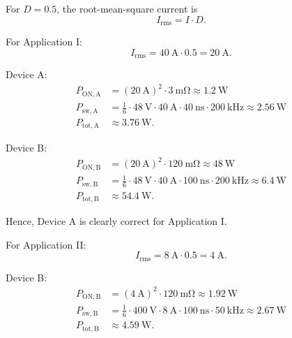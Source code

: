 \begin{solutionblock}
    For $D = 0.5$, the root-mean-square current is
    \begin{equation}
        I_\mathrm{rms} = I \cdot D.
    \end{equation}

    For Application I:
    \begin{equation}
        I_\mathrm{rms} = \SI{40}{\ampere} \cdot 0.5 = \SI{20}{\ampere}.
    \end{equation}

    Device A:
    \begin{align}
        P_\mathrm{ON,A} &= \left( \SI{20}{\ampere} \right)^2 \cdot \SI{3}{\milli\ohm} \approx \SI{1.2}{\watt} \\
        P_\mathrm{sw,A} &= \frac{1}{6} \cdot \SI{48}{\volt} \cdot \SI{40}{\ampere} \cdot \SI{40}{\nano\second} \cdot \SI{200}{\kilo\hertz}
        \approx \SI{2.56}{\watt} \\
        P_\mathrm{tot,A} &\approx \SI{3.76}{\watt}.
    \end{align}

    Device B:
    \begin{align}
        P_\mathrm{ON,B} &= \left( \SI{20}{\ampere} \right)^2 \cdot \SI{120}{\milli\ohm} \approx \SI{48}{\watt} \\
        P_\mathrm{sw,B} &= \frac{1}{6} \cdot \SI{48}{\volt} \cdot \SI{40}{\ampere} \cdot \SI{100}{\nano\second} \cdot \SI{200}{\kilo\hertz}
        \approx \SI{6.4}{\watt} \\
        P_\mathrm{tot,B} &\approx \SI{54.4}{\watt}.
    \end{align}

    Hence, Device A is clearly correct for Application I.

    For Application II:
    \begin{equation}
        I_\mathrm{rms} = \SI{8}{\ampere} \cdot 0.5 = \SI{4}{\ampere}.
    \end{equation}

    Device B:
    \begin{align}
        P_\mathrm{ON,B} &= \left( \SI{4}{\ampere} \right)^2 \cdot \SI{120}{\milli\ohm} \approx \SI{1.92}{\watt} \\
        P_\mathrm{sw,B} &= \frac{1}{6} \cdot \SI{400}{\volt} \cdot \SI{8}{\ampere} \cdot \SI{100}{\nano\second} \cdot \SI{50}{\kilo\hertz}
        \approx \SI{2.67}{\watt} \\
        P_\mathrm{tot,B} &\approx \SI{4.59}{\watt}.
    \end{align}

\end{solutionblock}

